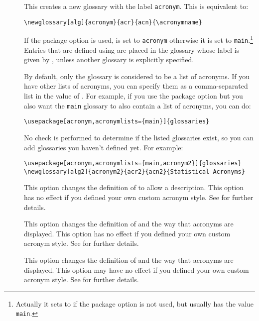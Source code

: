 \documentclass[report]{nlctdoc}
\begin{document}
\begin{description}
\item[] This creates a new glossary with the
label \texttt{acronym}. This is equivalent to:
\begin{verbatim}
\newglossary[alg]{acronym}{acr}{acn}{\acronymname}
\end{verbatim}
If the  package option is used, 
is set to \texttt{acronym} otherwise it is set to 
\texttt{main}.\footnote{Actually it sets  to
 if the  package option is
not used, but  usually has the value
\texttt{main}.} 
Entries that are defined using  are placed in
the glossary whose label is given by , unless
another glossary is explicitly specified.

\item[] By default, only the 
glossary is considered to be a list of acronyms. If you have other
lists of acronyms, you can specify them as a comma-separated list
in the value of . For example, if you use the
 package option but you also want the \texttt{main} 
glossary to also contain a list of acronyms, you can do:
\begin{verbatim}
\usepackage[acronym,acronymlists={main}]{glossaries}
\end{verbatim}
No check is performed to determine if the listed glossaries exist,
so you can add glossaries you haven't defined yet. For example:
\begin{verbatim}
\usepackage[acronym,acronymlists={main,acronym2}]{glossaries}
\newglossary[alg2]{acronym2}{acr2}{acn2}{Statistical Acronyms}
\end{verbatim}

\item[] This option changes the definition of
 to allow a description. This option has no effect if
you defined your own custom acronym style. See
 for further details.

\item[] This option changes the definition of
 and the way that acronyms are displayed. This
option has no effect if you defined your own custom acronym style. See
 for further details.

\item[] This option changes the definition of
 and the way that acronyms are displayed. This
option may have no effect if you defined your own custom acronym
style. See  for further details.


\end{description}
\end{document}
